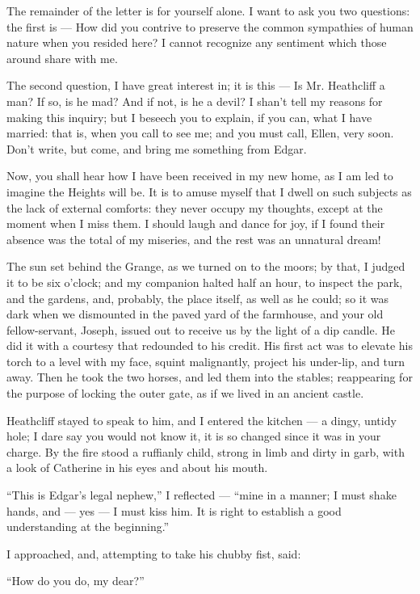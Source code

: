 \par The remainder of the letter is for yourself alone. I want to ask you two questions: the first is — How did you contrive to preserve the common sympathies of human nature when you resided here? I cannot recognize any sentiment which those around share with me.
\par The second question, I have great interest in; it is this — Is Mr. Heathcliff a man? If so, is he mad? And if not, is he a devil? I shan't tell my reasons for making this inquiry; but I beseech you to explain, if you can, what I have married: that is, when you call to see me; and you must call, Ellen, very soon. Don't write, but come, and bring me something from Edgar.
\par Now, you shall hear how I have been received in my new home, as I am led to imagine the Heights will be. It is to amuse myself that I dwell on such subjects as the lack of external comforts: they never occupy my thoughts, except at the moment when I miss them. I should laugh and dance for joy, if I found their absence was the total of my miseries, and the rest was an unnatural dream!
\par The sun set behind the Grange, as we turned on to the moors; by that, I judged it to be six o'clock; and my companion halted half an hour, to inspect the park, and the gardens, and, probably, the place itself, as well as he could; so it was dark when we dismounted in the paved yard of the farmhouse, and your old fellow-servant, Joseph, issued out to receive us by the light of a dip candle. He did it with a courtesy that redounded to his credit. His first act was to elevate his torch to a level with my face, squint malignantly, project his under-lip, and turn away. Then he took the two horses, and led them into the stables; reappearing for the purpose of locking the outer gate, as if we lived in an ancient castle.
\par Heathcliff stayed to speak to him, and I entered the kitchen — a dingy, untidy hole; I dare say you would not know it, it is so changed since it was in your charge. By the fire stood a ruffianly child, strong in limb and dirty in garb, with a look of Catherine in his eyes and about his mouth.
\par “This is Edgar's legal nephew,” I reflected — “mine in a manner; I must shake hands, and — yes — I must kiss him. It is right to establish a good understanding at the beginning.”
\par I approached, and, attempting to take his chubby fist, said:
\par “How do you do, my dear?”
